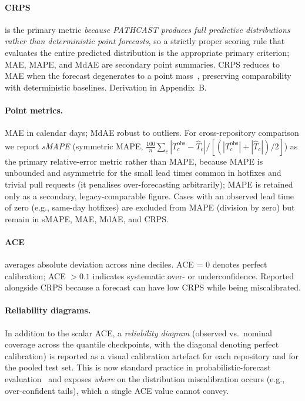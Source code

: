 \paragraph{CRPS} is the primary metric \emph{because PATHCAST produces full
predictive distributions rather than deterministic point forecasts}, so a
strictly proper scoring rule that evaluates the entire predicted
distribution is the appropriate primary criterion; MAE, MAPE, and MdAE are
secondary point summaries. CRPS reduces to MAE when the forecast degenerates
to a point mass~\cite{gneiting2007strictly}, preserving comparability with
deterministic baselines. Derivation in Appendix~B.

\paragraph{Point metrics.} MAE in calendar days; MdAE robust to outliers.
For cross-repository comparison we report \emph{sMAPE} (symmetric MAPE,
$\tfrac{100}{n}\sum_c |T_c^{\text{obs}}-\hat{T}_c| /
[(|T_c^{\text{obs}}|+|\hat{T}_c|)/2]$) as the primary relative-error metric
rather than MAPE, because MAPE is unbounded and asymmetric for the small
lead times common in hotfixes and trivial pull requests (it penalises
over-forecasting arbitrarily); MAPE is retained only as a secondary,
legacy-comparable figure. Cases with an observed lead time of
zero (e.g., same-day hotfixes) are excluded from MAPE (division by zero) but
remain in sMAPE, MAE, MdAE, and CRPS.

\paragraph{ACE} averages absolute deviation across nine deciles. ACE = 0
denotes perfect calibration; ACE $> 0.1$ indicates systematic over- or
underconfidence. Reported alongside CRPS because a forecast can have low
CRPS while being miscalibrated.

\paragraph{Reliability diagrams.} In addition to the scalar ACE, a
\emph{reliability diagram} (observed vs.\ nominal coverage across the
quantile checkpoints, with the diagonal denoting perfect calibration) is
reported as a visual calibration artefact for each repository and for the
pooled test set. This is now standard practice in probabilistic-forecast
evaluation~\cite{gneiting2007strictly} and exposes \emph{where} on the
distribution miscalibration occurs (e.g., over-confident tails), which a
single ACE value cannot convey.

